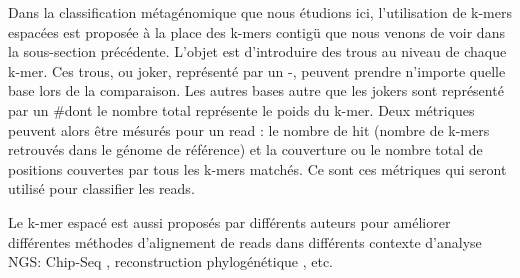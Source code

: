Dans la classification métagénomique que nous étudions ici, l'utilisation de k-mers espacées est proposée à la place des k-mers contigü que nous venons de voir dans la sous-section précédente.
L'objet est d'introduire des trous au niveau de chaque k-mer. Ces trous, ou joker, représenté par un \og-\fg, peuvent prendre n'importe quelle base lors de la comparaison. Les autres bases autre que les jokers sont représenté par un \og\#\fg dont le nombre total représente le poids du k-mer.
Deux métriques peuvent alors être mésurés pour un read : le nombre de hit (nombre de k-mers retrouvés dans le génome de référence) et la couverture ou le nombre total de positions couvertes par tous les k-mers matchés. Ce sont ces métriques qui seront utilisé pour classifier les reads.

Le k-mer espacé est aussi proposés par différents auteurs pour améliorer différentes méthodes d'alignement de reads dans différents contexte d'analyse NGS: Chip-Seq \cite{Ghandi2014}, reconstruction phylogénétique \cite{Leimeister2014}, etc.

